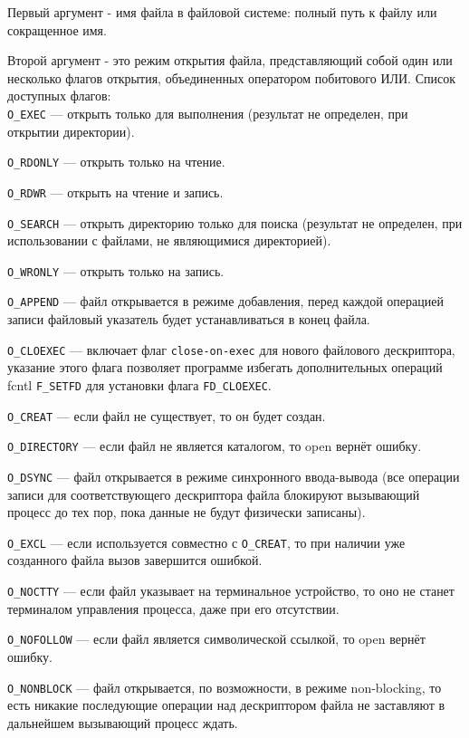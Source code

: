 \documentclass[a4paper,14pt]{extreport}
\begin{document}
Первый аргумент - имя файла в файловой системе: полный путь к файлу или сокращенное имя.

Второй аргумент - это режим открытия файла, представляющий собой один или несколько флагов открытия, объединенных оператором побитового ИЛИ. Список доступных флагов: \\


\texttt{O\_EXEC} --- открыть только для выполнения (результат не определен, при открытии директории).

\texttt{O\_RDONLY} --- открыть только на чтение.

\texttt{O\_RDWR} --- открыть на чтение и запись.

\texttt{O\_SEARCH} --- открыть директорию только для поиска (результат не определен, при использовании с файлами, не являющимися директорией).

\texttt{O\_WRONLY} --- открыть только на запись.

\texttt{O\_APPEND} --- файл открывается в режиме добавления, перед каждой операцией записи файловый указатель будет устанавливаться в конец файла.

\texttt{O\_CLOEXEC} --- включает флаг \texttt{close-on-exec} для нового файлового дескриптора, указание этого флага позволяет программе избегать дополнительных операций fcntl \texttt{F\_SETFD} для установки флага \texttt{FD\_CLOEXEC}.

\texttt{O\_CREAT} --- если файл не существует, то он будет создан.

\texttt{O\_DIRECTORY} --- если файл не является каталогом, то open вернёт ошибку.

\texttt{O\_DSYNC} --- файл открывается в режиме синхронного ввода-вывода (все операции записи для соответствующего дескриптора файла блокируют вызывающий процесс до тех пор, пока данные не будут физически записаны).

\texttt{O\_EXCL} --- если используется совместно с \texttt{O\_CREAT}, то при наличии уже созданного файла вызов завершится ошибкой.

\texttt{O\_NOCTTY} --- если файл указывает на терминальное устройство, то оно не станет терминалом управления процесса, даже при его отсутствии.

\texttt{O\_NOFOLLOW} --- если файл является символической ссылкой, то open вернёт ошибку.

\texttt{O\_NONBLOCK} --- файл открывается, по возможности, в режиме non-blocking, то есть никакие последующие операции над дескриптором файла не заставляют в дальнейшем вызывающий процесс ждать.
\end{document}
